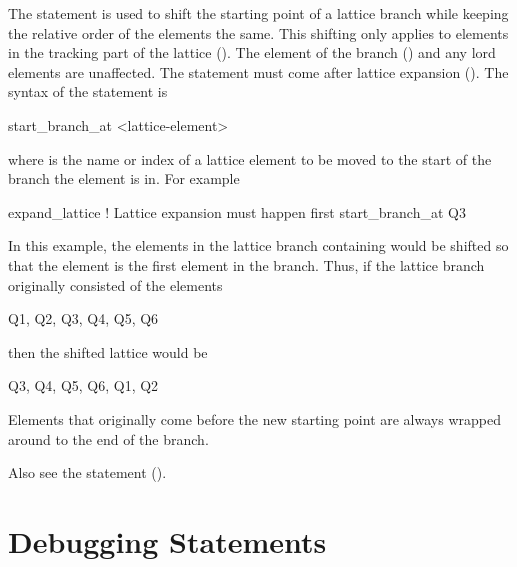 {{{{{The  statement is used to shift the starting point of a lattice branch while
keeping the relative order of the elements the same. This shifting only applies to elements in the
tracking part of the lattice (). The  element of the branch
() and any lord elements are unaffected. The  statement must come
after lattice expansion (). The syntax of the  statement is
\begin{example}
  start_branch_at <lattice-element>
\end{example}
where  is the name or index of a lattice element to be moved to the start
of the branch the element is in. For example
\begin{example}
  expand_lattice           ! Lattice expansion must happen first
  start_branch_at Q3
\end{example}
In this example, the elements in the lattice branch containing  would be shifted so that the
 element is the first element in the branch. Thus, if the lattice branch originally consisted
of the elements
\begin{example}
  Q1,  Q2,  Q3,  Q4,  Q5,  Q6
\end{example}
then the shifted lattice would be
\begin{example}
  Q3,  Q4,  Q5,  Q6, Q1,  Q2
\end{example}
Elements that originally come before the new starting point are always wrapped around to the end of
the branch. 

Also see the  statement ().

%

\section{Debugging Statements}
\label{s:debug}

}}}}}
